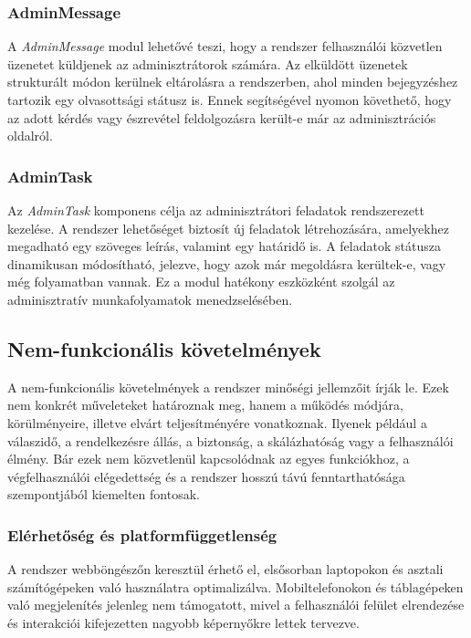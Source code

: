 \subsubsection{AdminMessage}

A \textit{AdminMessage} modul lehetővé teszi, hogy a rendszer felhasználói közvetlen üzenetet küldjenek az adminisztrátorok számára. Az elküldött üzenetek strukturált módon kerülnek eltárolásra a rendszerben, ahol minden bejegyzéshez tartozik egy olvasottsági státusz is. Ennek segítségével nyomon követhető, hogy az adott kérdés vagy észrevétel feldolgozásra került-e már az adminisztrációs oldalról.

\subsubsection{AdminTask}

Az \textit{AdminTask} komponens célja az adminisztrátori feladatok rendszerezett kezelése. A rendszer lehetőséget biztosít új feladatok létrehozására, amelyekhez megadható egy szöveges leírás, valamint egy határidő is. A feladatok státusza dinamikusan módosítható, jelezve, hogy azok már megoldásra kerültek-e, vagy még folyamatban vannak. Ez a modul hatékony eszközként szolgál az adminisztratív munkafolyamatok menedzselésében.



\subsection{Nem-funkcionális követelmények}

A nem-funkcionális követelmények a rendszer minőségi jellemzőit írják le. Ezek nem konkrét műveleteket határoznak meg, hanem a működés módjára, körülményeire, illetve elvárt teljesítményére vonatkoznak. Ilyenek például a válaszidő, a rendelkezésre állás, a biztonság, a skálázhatóság vagy a felhasználói élmény. Bár ezek nem közvetlenül kapcsolódnak az egyes funkciókhoz, a végfelhasználói elégedettség és a rendszer hosszú távú fenntarthatósága szempontjából kiemelten fontosak.

\subsubsection{Elérhetőség és platformfüggetlenség}

A rendszer webböngészőn keresztül érhető el, elsősorban laptopokon és asztali számítógépeken való használatra optimalizálva. Mobiltelefonokon és táblagépeken való megjelenítés jelenleg nem támogatott, mivel a felhasználói felület elrendezése és interakciói kifejezetten nagyobb képernyőkre lettek tervezve.

